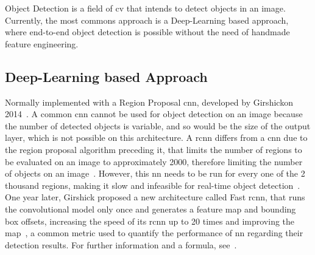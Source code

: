 Object Detection is a field of \acl{cv} that intends to detect objects in an image. Currently, the most commons approach is a Deep-Learning based approach, where end-to-end object detection is possible without the need of handmade feature engineering.




\subsection{Deep-Learning based Approach}
Normally implemented with a Region Proposal \acf{cnn}, developed by Girshick\etal on 2014~\cite{Girshick2014}. A common \ac{cnn} cannot be used for object detection on an image because the number of detected objects is variable, and so would be the size of the output layer, which is not possible on this architecture. A \ac{rcnn} differs from a \ac{cnn} due to the region proposal algorithm preceding it, that limits the number of regions to be evaluated on an image to approximately 2000, therefore limiting the number of objects on an image~\cite{Girshick2014}. However, this \acl{nn} needs to be run for every one of the 2 thousand regions, making it slow and infeasible for real-time object detection~\cite{Girshick2014}. One year later, Girshick proposed a new architecture called Fast \ac{rcnn}, that runs the convolutional model only once and generates a feature map and bounding box offsets, increasing the speed of its \ac{rcnn} up to 20 times and improving the \ac{map}~\cite{Girshick2015}, a common metric used to quantify the performance of \ac{nn} regarding their detection results. For further information and a formula, see~\cite{mAP, AP}.

